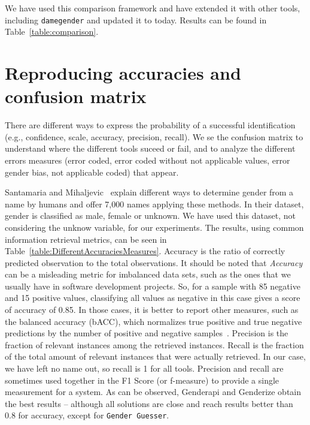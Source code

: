 \documentclass[a4paper]{article}
\begin{document}
We have used this comparison framework and have extended it with other tools, including \texttt{damegender} and updated it to today.
Results can be found in Table~\ref{table:comparison}.

\section{Reproducing accuracies and confusion matrix}

There are different ways to express the probability of a successful identification (e.g., confidence, scale, accuracy, precision, recall).
We se the confusion matrix to understand where the different tools suceed or fail, and to analyze the different errors measures (error coded, error coded without not applicable values, error gender bias, not applicable coded) that appear.

Santamaria and Mihaljevic~\cite{10.7717/peerj-cs.156} explain different ways to determine gender from a name by humans and offer 7,000 names applying these methods. 
In their dataset, gender is classified as male, female or unknown. 
We have used this dataset, not considering the unknow variable, for our experiments.
The results, using common information retrieval metrics, can be seen in Table~\ref{table:DifferentAccuraciesMeasures}.
Accuracy is the ratio of correctly predicted observation to the total observations.
It should be noted that \emph{Accuracy} can be a misleading metric for imbalanced data sets, such as the ones that we usually have in software development projects.
So, for a sample with 85 negative and 15 positive values, classifying all values as negative in this case gives a score of accuracy of 0.85.
In those cases, it is better to report other measures, such as the balanced accuracy (bACC), which normalizes true positive and true negative predictions by the number of positive and negative samples~\cite{mower2005prep}.
Precision is the fraction of relevant instances among the retrieved instances.
Recall is the fraction of the total amount of relevant instances that were actually retrieved.
In our case, we have left no name out, so recall is 1 for all tools.
Precision and recall are sometimes used together in the F1 Score (or f-measure) to provide a single measurement for a system.
As can be observed, Genderapi and Genderize obtain the best results -- although all solutions are close and reach results better than 0.8 for accuracy, except for \texttt{Gender Guesser}.

\end{document}

